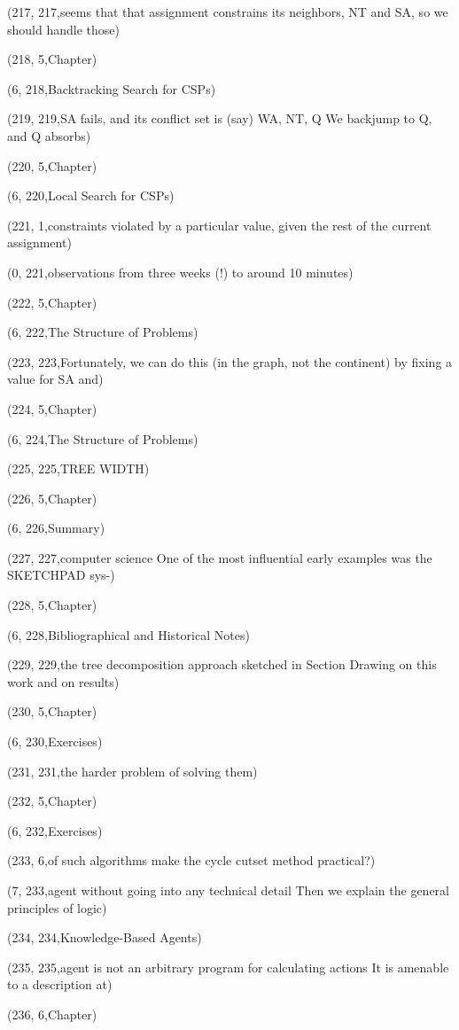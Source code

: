 (217, 217,seems that that assignment constrains its neighbors, NT and SA, so we should handle those)

(218, 5,Chapter)

(6, 218,Backtracking Search for CSPs)

(219, 219,SA fails, and its conﬂict set is (say) {WA, NT, Q} We backjump to Q, and Q absorbs)

(220, 5,Chapter)

(6, 220,Local Search for CSPs)

(221, 1,constraints violated by a particular value, given the rest of the current assignment)

(0, 221,observations from three weeks (!) to around 10 minutes)

(222, 5,Chapter)

(6, 222,The Structure of Problems)

(223, 223,Fortunately, we can do this (in the graph, not the continent) by ﬁxing a value for SA and)

(224, 5,Chapter)

(6, 224,The Structure of Problems)

(225, 225,TREE WIDTH)

(226, 5,Chapter)

(6, 226,Summary)

(227, 227,computer science One of the most inﬂuential early examples was the SKETCHPAD sys-)

(228, 5,Chapter)

(6, 228,Bibliographical and Historical Notes)

(229, 229,the tree decomposition approach sketched in Section  Drawing on this work and on results)

(230, 5,Chapter)

(6, 230,Exercises)

(231, 231,the harder problem of solving them)

(232, 5,Chapter)

(6, 232,Exercises)

(233, 6,of such algorithms make the cycle cutset method practical?)

(7, 233,agent without going into any technical detail Then we explain the general principles of logic)

(234, 234,Knowledge-Based Agents)

(235, 235,agent is not an arbitrary program for calculating actions It is amenable to a description at)

(236, 6,Chapter)

